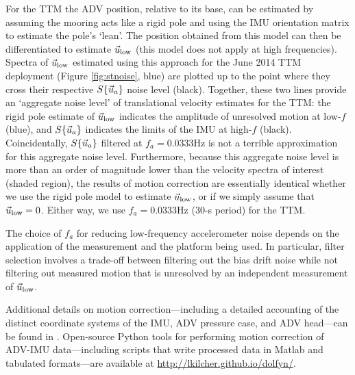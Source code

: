 For the TTM the ADV position, relative to its base, can be estimated by assuming the mooring acts like a rigid pole and using the IMU orientation matrix to estimate the pole's `lean'. The position obtained from this model can then be differentiated to estimate $\ulow$ (this model does not apply at high frequencies). Spectra of $\ulow$ estimated using this approach for the June 2014 TTM deployment (Figure \ref{fig:stnoise}, blue) are plotted up to the point where they cross their respective $\spec{\uacc}$ noise level (black).  Together, these two lines provide an `aggregate noise level' of translational velocity estimates for the TTM: the rigid pole estimate of $\ulow$ indicates the amplitude of unresolved motion at low-$f$ (blue), and $\spec{\uacc}$ indicates the limits of the IMU at high-$f$ (black). Coincidentally, $\spec{\uacc}$ filtered at $f_a = 0.0333$Hz is not a terrible approximation for this aggregate noise level. Furthermore, because this aggregate noise level is more than an order of magnitude lower than the velocity spectra of interest (shaded region), the results of motion correction are essentially identical whether we use the rigid pole model to estimate $\ulow$, or if we simply assume that $\ulow = 0$. Either way, we use $f_a = 0.0333$Hz (30-s period) for the TTM.

The choice of $f_a$ for reducing low-frequency accelerometer noise depends on the application of the measurement and the platform being used. In particular, filter selection involves a trade-off between filtering out the bias drift noise while not filtering out measured motion that is unresolved by an independent measurement of $\ulow$. 


Additional details on motion correction---including a detailed accounting of the distinct coordinate systems of the IMU, ADV pressure case, and ADV head---can be found in \cite{Kilcher++2016}. Open-source Python tools for performing motion correction of ADV-IMU data---including scripts that write processed data in Matlab and tabulated formats---are available at \url{http://lkilcher.github.io/dolfyn/}.

\def\ue{\ensuremath{\vec{u}\earth}}

